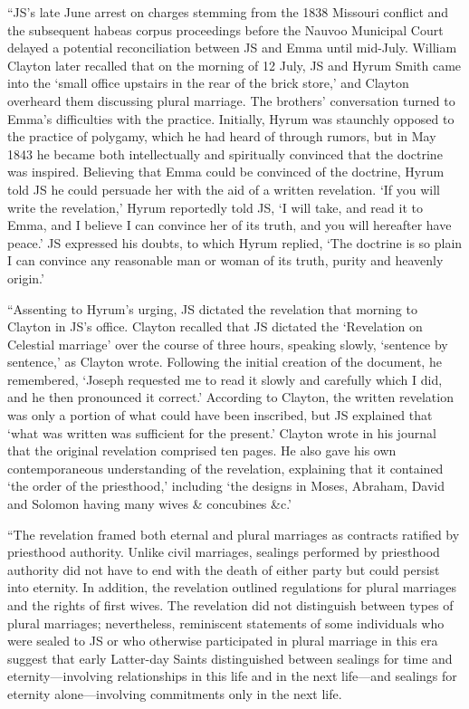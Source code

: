 			``JS's late June arrest on charges stemming from the 1838 Missouri conflict and the subsequent habeas corpus proceedings before the Nauvoo Municipal Court delayed a potential reconciliation between JS and Emma until mid-July. William Clayton later recalled that on the morning of 12 July, JS and Hyrum Smith came into the `small office upstairs in the rear of the brick store,' and Clayton overheard them discussing plural marriage. The brothers' conversation turned to Emma's difficulties with the practice. Initially, Hyrum was staunchly opposed to the practice of polygamy, which he had heard of through rumors, but in May 1843 he became both intellectually and spiritually convinced that the doctrine was inspired. Believing that Emma could be convinced of the doctrine, Hyrum told JS he could persuade her with the aid of a written revelation. `If you will write the revelation,' Hyrum reportedly told JS, `I will take, and read it to Emma, and I believe I can convince her of its truth, and you will hereafter have peace.' JS expressed his doubts, to which Hyrum replied, `The doctrine is so plain I can convince any reasonable man or woman of its truth, purity and heavenly origin.'

			``Assenting to Hyrum's urging, JS dictated the revelation that morning to Clayton in JS's office. Clayton recalled that JS dictated the `Revelation on Celestial marriage' over the course of three hours, speaking slowly, `sentence by sentence,' as Clayton wrote. Following the initial creation of the document, he remembered, `Joseph requested me to read it slowly and carefully which I did, and he then pronounced it correct.' According to Clayton, the written revelation was only a portion of what could have been inscribed, but JS explained that `what was written was sufficient for the present.' Clayton wrote in his journal that the original revelation comprised ten pages. He also gave his own contemporaneous understanding of the revelation, explaining that it contained `the order of the priesthood,' including `the designs in Moses, Abraham, David and Solomon having many wives \& concubines \&c.'

			``The revelation framed both eternal and plural marriages as contracts ratified by priesthood authority. Unlike civil marriages, sealings performed by priesthood authority did not have to end with the death of either party but could persist into eternity. In addition, the revelation outlined regulations for plural marriages and the rights of first wives. The revelation did not distinguish between types of plural marriages; nevertheless, reminiscent statements of some individuals who were sealed to JS or who otherwise participated in plural marriage in this era suggest that early Latter-day Saints distinguished between sealings for time and eternity---involving relationships in this life and in the next life---and sealings for eternity alone---involving commitments only in the next life.

